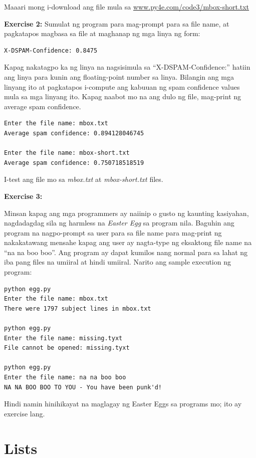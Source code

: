 \documentclass[10pt,]{book}
\begin{document}
Maaari mong i-download ang file mula sa
\href{http://www.py4e.com/code3/mbox-short.txt}{www.py4e.com/code3/mbox-short.txt}

\textbf{Exercise 2:} Sumulat ng program para mag-prompt para sa file
name, at pagkatapos magbasa sa file at maghanap ng mga linya ng form:

{\small
\begin{verbatim}
X-DSPAM-Confidence: 0.8475
\end{verbatim}
}

Kapag nakatagpo ka ng linya na nagsisimula sa ``X-DSPAM-Confidence:''
hatiin ang linya para kunin ang floating-point number sa linya. Bilangin
ang mga linyang ito at pagkatapos i-compute ang kabuuan ng spam
confidence values mula sa mga linyang ito. Kapag naabot mo na ang dulo
ng file, mag-print ng average spam confidence.

{\small
\begin{verbatim}
Enter the file name: mbox.txt
Average spam confidence: 0.894128046745

Enter the file name: mbox-short.txt
Average spam confidence: 0.750718518519
\end{verbatim}
}

I-test ang file mo sa \emph{mbox.txt} at \emph{mbox-short.txt} files.

\textbf{Exercise 3:}

Minsan kapag ang mga programmers ay naiinip o gusto ng kaunting
kasiyahan, nagdadagdag sila ng harmless na \emph{Easter Egg} sa program
nila. Baguhin ang program na nagpo-prompt sa user para sa file name para
mag-print ng nakakatawang mensahe kapag ang user ay nagta-type ng
eksaktong file name na ``na na boo boo''. Ang program ay dapat kumilos
nang normal para sa lahat ng iba pang files na umiiral at hindi umiiral.
Narito ang sample execution ng program:

{\small
\begin{verbatim}
python egg.py
Enter the file name: mbox.txt
There were 1797 subject lines in mbox.txt

python egg.py
Enter the file name: missing.tyxt
File cannot be opened: missing.tyxt

python egg.py
Enter the file name: na na boo boo
NA NA BOO BOO TO YOU - You have been punk'd!
\end{verbatim}
}

Hindi namin hinihikayat na maglagay ng Easter Eggs sa programs mo; ito
ay exercise lang.

\chapter{Lists}\label{lists}
\end{document}

